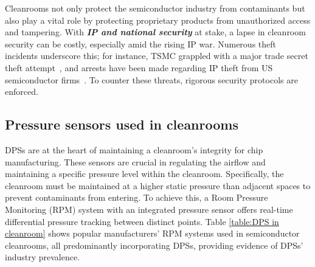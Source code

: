 Cleanrooms not only protect the semiconductor industry from contaminants but also play a vital role by protecting proprietary products from unauthorized access and tampering. 
With \textbf{\textit{IP and national security}} at stake, a lapse in cleanroom security can be costly, especially amid the rising IP war.
Numerous theft incidents underscore this; for instance, TSMC grappled with a major trade secret theft attempt~\cite{taipeitimes_tsmc_2017}, and arrests have been made regarding IP theft from US semiconductor firms~\cite{justice_chinese_2018,justice_chinese_2021,justice2018lexington}.
To counter these threats, rigorous security protocols are enforced. 


\subsection{{Pressure sensors used in cleanrooms}}
\label{subsection:psincleanrooms}

{ 
DPSs are at the heart of maintaining a cleanroom's integrity for chip manufacturing.
These sensors are crucial in regulating the airflow and maintaining a specific pressure level within the cleanroom. 
Specifically, the cleanroom must be maintained at a higher static pressure than adjacent spaces to prevent contaminants from entering. 
To achieve this, a Room Pressure Monitoring (RPM) system with an integrated pressure sensor offers real-time differential pressure tracking between distinct points.
Table \ref{table:DPS in cleanroom} 
shows popular manufacturers' RPM systems used in semiconductor cleanrooms, all predominantly incorporating DPSs, providing evidence of DPSs' industry prevalence.
}


